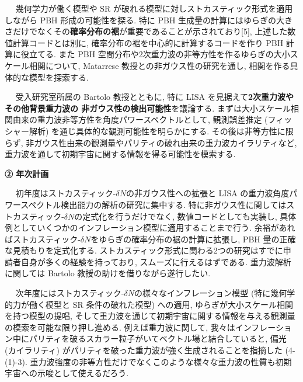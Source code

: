 \documentclass[11pt,a4paper,uplatex,twoside,dvipdfmx]{ujarticle} 	%
\renewcommand{\emph}[1]{{\sffamily\gtfamily\bfseries #1}}
\newcommand{\subject}[1]{\noindent{\sffamily\gtfamily\bfseries #1}~~}
\newcommand{\研究課題名}{\mgfamily ストカスティック形式、原始ブラックホール、重力波観測から迫るインフレーション}
\newcommand{\研究機関名}{\mgfamily 名古屋大学}
\newcommand{\申請者氏名}{\mgfamily 多田 祐一郎}
\newcommand{\研究代表者氏名}{\申請者氏名}
\newcommand{\研究期間の最終元号年度}{34}	%
\begin{document}
{	
	\vspace{3pt}
	\subject{2. PBH}
	幾何学力が働く模型や SR が破れる模型に対しストカスティック形式を適用しながら PBH 形成の可能性を探る.
	特に PBH 生成量の計算にはゆらぎの大きさだけでなくその\emph{確率分布の裾}が重要であることが示されており[5],
	上述した数値計算コードとは別に, 確率分布の裾を中心的に計算するコードを作り PBH 計算に役立てる.
	また PBH 空間分布や2次重力波の非等方性を作るゆらぎの大小スケール相関について,
	Matarrese 教授との非ガウス性の研究を通し, 相関を作る具体的な模型を探索する.
	
	
	\vspace{3pt}
	\subject{3. 重力波}
	受入研究室所属の Bartolo 教授とともに, 特に LISA を見据えて\emph{2次重力波やその他背景重力波の
	非ガウス性の検出可能性}を議論する.
	まずは大小スケール相関由来の重力波非等方性を角度パワースペクトルとして,
	観測誤差推定 (フィッシャー解析) を通じ具体的な観測可能性を明らかにする.
	その後は非等方性に限らず, 非ガウス性由来の観測量やパリティの破れ由来の重力波カイラリティなど,
	重力波を通して初期宇宙に関する情報を得る可能性を模索する.
	
	
	
	
	\begin{mdframed}[roundcorner=0.5zw,
	innertopmargin=0.8zw,innerbottommargin=0.8zw,
	linecolor=black!50,linewidth=0.2zw,
	backgroundcolor=black!10]
	{\bfseries\gtfamily\sffamily\large ② 年次計画}
	\end{mdframed}
	
	\vspace{-10pt}
	\subject{1年目}
	初年度はストカスティック-$\delta N$の非ガウス性への拡張と LISA の重力波角度パワースペクトル検出能力の解析の研究に集中する.
	特に非ガウス性に関してはストカスティック-$\delta N$の定式化を行うだけでなく, 数値コードとしても実装し,
	具体例としていくつかのインフレーション模型に適用することまで行う.
	余裕があればストカスティック-$\delta N$をゆらぎの確率分布の裾の計算に拡張し, PBH 量の正確な見積もりを定式化する.
	ストカスティック形式に関わる2つの研究はすでに申請者自身が多くの経験を持っており, スムーズに行えるはずである.
	重力波解析に関しては Bartolo 教授の助けを借りながら遂行したい.
	
	
	\vspace{3pt}
	\subject{2年目}
	次年度にはストカスティック-$\delta N$の様々なインフレーション模型 (特に幾何学的力が働く模型と SR 条件の破れた模型) への適用,
	ゆらぎが大小スケール相関を持つ模型の提唱, そして重力波を通じて初期宇宙に関する情報を与える観測量の模索を可能な限り押し進める.
	例えば重力波に関して, 我々はインフレーション中にパリティを破るスカラー粒子がいてベクトル場と結合していると, 偏光 (カイラリティ) がパリティを破った重力波が強く生成されることを指摘した (4-(1)-3).
	重力波強度の非等方性だけでなくこのような様々な重力波の性質も初期宇宙への示唆として使えるだろう.
	
}
\end{document}
